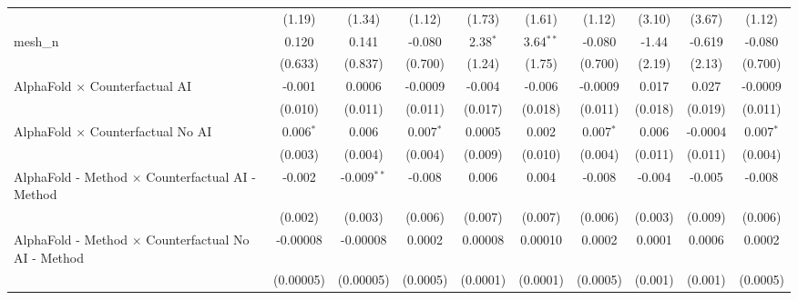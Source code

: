 \begin{tabular}{lccccccccc}
                                                               & (1.19)         & (1.34)         & (1.12)        & (1.73)         & (1.61)         & (1.12)        & (3.10)       & (3.67)      & (1.12)\\   
   mesh\_n                                                     & 0.120          & 0.141          & -0.080        & 2.38$^{*}$     & 3.64$^{**}$    & -0.080        & -1.44        & -0.619      & -0.080\\   
                                                               & (0.633)        & (0.837)        & (0.700)       & (1.24)         & (1.75)         & (0.700)       & (2.19)       & (2.13)      & (0.700)\\   
   AlphaFold $\times$ Counterfactual AI                        & -0.001         & 0.0006         & -0.0009       & -0.004         & -0.006         & -0.0009       & 0.017        & 0.027       & -0.0009\\   
                                                               & (0.010)        & (0.011)        & (0.011)       & (0.017)        & (0.018)        & (0.011)       & (0.018)      & (0.019)     & (0.011)\\   
   AlphaFold $\times$ Counterfactual No AI                     & 0.006$^{*}$    & 0.006          & 0.007$^{*}$   & 0.0005         & 0.002          & 0.007$^{*}$   & 0.006        & -0.0004     & 0.007$^{*}$\\   
                                                               & (0.003)        & (0.004)        & (0.004)       & (0.009)        & (0.010)        & (0.004)       & (0.011)      & (0.011)     & (0.004)\\   
   AlphaFold - Method $\times$ Counterfactual AI - Method      & -0.002         & -0.009$^{**}$  & -0.008        & 0.006          & 0.004          & -0.008        & -0.004       & -0.005      & -0.008\\   
                                                               & (0.002)        & (0.003)        & (0.006)       & (0.007)        & (0.007)        & (0.006)       & (0.003)      & (0.009)     & (0.006)\\   
   AlphaFold - Method $\times$ Counterfactual No AI - Method   & -0.00008       & -0.00008       & 0.0002        & 0.00008        & 0.00010        & 0.0002        & 0.0001       & 0.0006      & 0.0002\\   
                                                               & (0.00005)      & (0.00005)      & (0.0005)      & (0.0001)       & (0.0001)       & (0.0005)      & (0.001)      & (0.001)     & (0.0005)\\   

\end{tabular}
